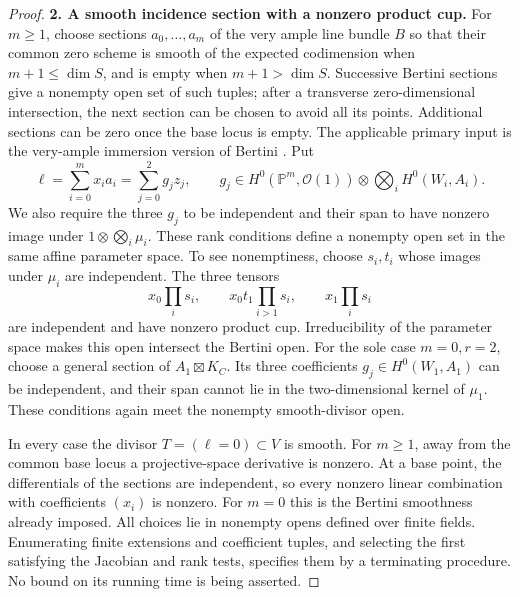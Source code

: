 \begin{proof}
\textbf{2. A smooth incidence section with a nonzero product cup.}
For $m\ge1$, choose sections $a_0,\ldots,a_m$ of the very ample
line bundle $B$ so that their common zero scheme is smooth of the
expected codimension when $m+1\le\dim S$, and is empty when
$m+1>\dim S$. Successive Bertini sections give a nonempty open set
of such tuples; after a transverse zero-dimensional intersection,
the next section can be chosen to avoid all its points. Additional
sections can be zero once the base locus is empty. The applicable
primary input is the very-ample immersion version of Bertini
\citep[Lemma 33.47.3, Tag 0FD6]{D_StacksBertiniUniformHigher}.
Put
\[
 \ell=\sum_{i=0}^m x_i a_i=\sum_{j=0}^2 g_jz_j,
 \qquad
 g_j\in H^0(\mathbb P^m,\mathcal O(1))
                    \otimes\bigotimes_iH^0(W_i,A_i).
 \tag{C.3bk.5}
\]
We also require the three $g_j$ to be independent and their span to
have nonzero image under $1\otimes\bigotimes_i\mu_i$.
These rank conditions define a nonempty open set in the same affine
parameter space. To see nonemptiness, choose $s_i,t_i$ whose images
under $\mu_i$ are independent. The three tensors
\[
 x_0\prod_i s_i,\qquad
 x_0t_1\prod_{i>1}s_i,\qquad
 x_1\prod_i s_i
\]
are independent and have nonzero product cup. Irreducibility of the
parameter space makes this open intersect the Bertini open.
For the sole case $m=0,r=2$, choose a general section of $A_1\boxtimes K_C$.
Its three coefficients $g_j\in H^0(W_1,A_1)$ can be independent,
and their span cannot lie in the two-dimensional kernel of $\mu_1$.
These conditions again meet the nonempty smooth-divisor open.

In every case the divisor $T=(\ell=0)\subset V$ is smooth.
For $m\ge1$, away from the common base locus a projective-space
derivative is nonzero. At a base point, the differentials of the
sections are independent, so every nonzero linear combination with
coefficients $(x_i)$ is nonzero. For $m=0$ this is the Bertini
smoothness already imposed. All choices lie in nonempty opens defined
over finite fields. Enumerating finite extensions and coefficient
tuples, and selecting the first satisfying the Jacobian and rank
tests, specifies them by a terminating procedure. No bound on its
running time is being asserted.


\end{proof}
